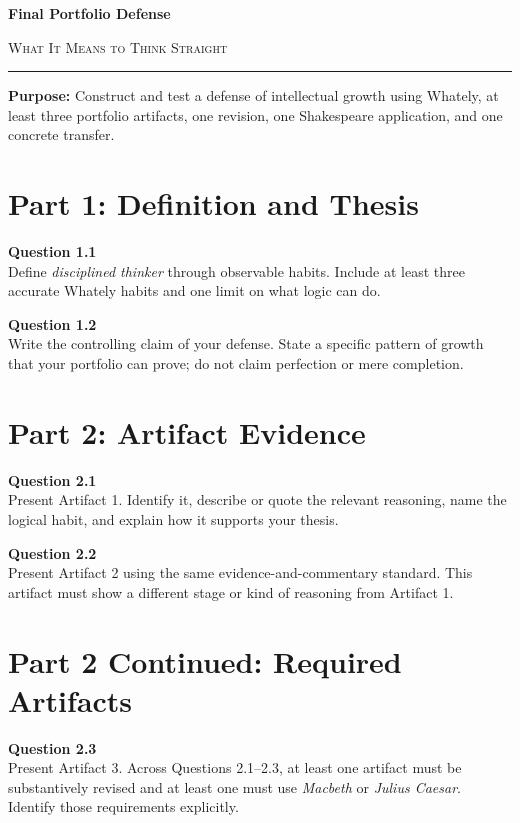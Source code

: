\documentclass[12pt]{article}
\begin{document}
\begin{center}
{\LARGE\bfseries Final Portfolio Defense}\par\vspace{0.05em}
{\large\scshape What It Means to Think Straight}\par\vspace{0.1em}
\rule{0.78\textwidth}{0.5pt}\par\vspace{0.15em}
\end{center}
\noindent\textbf{Purpose:} Construct and test a defense of intellectual growth using Whately, at least three portfolio artifacts, one revision, one Shakespeare application, and one concrete transfer.
\vspace{0.3em}

\section*{Part 1: Definition and Thesis}
\textbf{Question 1.1}\\[-0.15em]
Define \emph{disciplined thinker} through observable habits. Include at least three accurate Whately habits and one limit on what logic can do.

\textbf{Question 1.2}\\[-0.15em]
Write the controlling claim of your defense. State a specific pattern of growth that your portfolio can prove; do not claim perfection or mere completion.

\newpage
\section*{Part 2: Artifact Evidence}
\textbf{Question 2.1}\\[-0.15em]
Present Artifact 1. Identify it, describe or quote the relevant reasoning, name the logical habit, and explain how it supports your thesis.

\textbf{Question 2.2}\\[-0.15em]
Present Artifact 2 using the same evidence-and-commentary standard. This artifact must show a different stage or kind of reasoning from Artifact 1.

\newpage
\section*{Part 2 Continued: Required Artifacts}
\textbf{Question 2.3}\\[-0.15em]
Present Artifact 3. Across Questions 2.1--2.3, at least one artifact must be substantively revised and at least one must use \emph{Macbeth} or \emph{Julius Caesar}. Identify those requirements explicitly.
\end{document}
